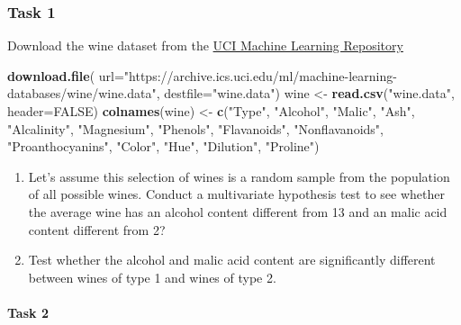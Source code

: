 \documentclass[
]{book}
\newenvironment{Shaded}{\begin{snugshade}}{\end{snugshade}}
\newcommand{\AttributeTok}[1]{\textcolor[rgb]{0.13,0.29,0.53}{#1}}
\newcommand{\ConstantTok}[1]{\textcolor[rgb]{0.56,0.35,0.01}{#1}}
\newcommand{\FunctionTok}[1]{\textcolor[rgb]{0.13,0.29,0.53}{\textbf{#1}}}
\newcommand{\NormalTok}[1]{#1}
\newcommand{\OtherTok}[1]{\textcolor[rgb]{0.56,0.35,0.01}{#1}}
\newcommand{\StringTok}[1]{\textcolor[rgb]{0.31,0.60,0.02}{#1}}
\theoremstyle{definition}
\theoremstyle{definition}
\theoremstyle{definition}
\theoremstyle{definition}
\theoremstyle{remark}
\begin{document}
\subsubsection*{Task 1}\label{task-1-2}

Download the wine dataset from the \href{https://archive.ics.uci.edu/ml/datasets/wine}{UCI Machine Learning Repository}

\begin{Shaded}
\begin{Highlighting}[]
\FunctionTok{download.file}\NormalTok{(}
  \AttributeTok{url=}\StringTok{"https://archive.ics.uci.edu/ml/machine{-}learning{-}databases/wine/wine.data"}\NormalTok{, }
              \AttributeTok{destfile=}\StringTok{"wine.data"}\NormalTok{)}
\NormalTok{wine }\OtherTok{\textless{}{-}} \FunctionTok{read.csv}\NormalTok{(}\StringTok{"wine.data"}\NormalTok{, }\AttributeTok{header=}\ConstantTok{FALSE}\NormalTok{)}
\FunctionTok{colnames}\NormalTok{(wine) }\OtherTok{\textless{}{-}} \FunctionTok{c}\NormalTok{(}\StringTok{"Type"}\NormalTok{, }\StringTok{"Alcohol"}\NormalTok{, }\StringTok{"Malic"}\NormalTok{,}
\StringTok{"Ash"}\NormalTok{,}
\StringTok{"Alcalinity"}\NormalTok{,}
\StringTok{"Magnesium"}\NormalTok{,}
\StringTok{"Phenols"}\NormalTok{,}
\StringTok{"Flavanoids"}\NormalTok{,}
\StringTok{"Nonflavanoids"}\NormalTok{,}
\StringTok{"Proanthocyanins"}\NormalTok{,}
\StringTok{"Color"}\NormalTok{,}
\StringTok{"Hue"}\NormalTok{,}
\StringTok{"Dilution"}\NormalTok{,}
\StringTok{"Proline"}\NormalTok{)}
\end{Highlighting}
\end{Shaded}

\begin{enumerate}
\def\labelenumi{\roman{enumi}.}
\item
  Let's assume this selection of wines is a random sample from the population of all possible wines. Conduct a multivariate hypothesis test to see whether the average wine has an alcohol content different from 13 and an malic acid content different from 2?
\item
  Test whether the alcohol and malic acid content are significantly different between wines of type 1 and wines of type 2.
\end{enumerate}

\paragraph*{Task 2}\label{task-2-2}
\end{document}
